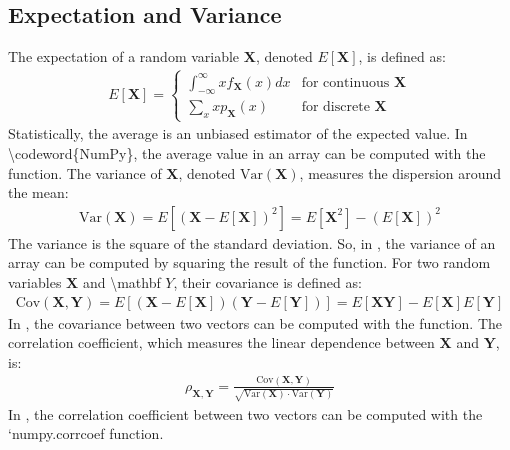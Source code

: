 \documentclass[letterpaper,10pt,english]{jupyterBook}
\begin{document}
\subsection{Expectation and Variance}
\label{\detokenize{01:expectation-and-variance}}
\sphinxAtStartPar
The expectation of a random variable \(\mathbf X\), denoted \(E[\mathbf X]\), is defined as:
\begin{equation*}
\begin{split}
E[\mathbf X] = \begin{cases}
    \int_{-\infty}^{\infty} x f_{\mathbf X}(x) dx & \text{for continuous $\mathbf X$} \\
    \sum_{x} x p_{\mathbf X}(x) & \text{for discrete $\mathbf X$}
\end{cases}
\end{split}
\end{equation*}
\sphinxAtStartPar
Statistically, the average is an unbiased estimator of the expected value. In \textbackslash{}codeword\{NumPy\}, the average value in an array can be computed with the  function.
The variance of \(\mathbf X\), denoted \(\text{Var}(\mathbf X)\), measures the dispersion around the mean:
\begin{equation*}
\begin{split}
\text{Var}(\mathbf X) = E[(\mathbf X - E[\mathbf X])^2] = E[\mathbf X^2] - (E[\mathbf X])^2
\end{split}
\end{equation*}
\sphinxAtStartPar
The variance is the square of the standard deviation.
So, in , the variance of an array can be computed by squaring the result of the  function.
For two random variables \(\mathbf X\) and \textbackslash{}mathbf \(Y\), their covariance is defined as:
\begin{equation*}
\begin{split}
\text{Cov}(\mathbf X, \mathbf Y) = E[(\mathbf X - E[\mathbf X])(\mathbf Y - E[\mathbf Y])] = E[\mathbf X\mathbf Y] - E[\mathbf X]E[\mathbf Y]
\end{split}
\end{equation*}
\sphinxAtStartPar
In , the covariance between two vectors can be computed with the  function.
The correlation coefficient, which measures the linear dependence between \(\mathbf X\) and \(\mathbf Y\), is:
\begin{equation*}
\begin{split}
\rho_{\mathbf X,\mathbf Y} = \frac{\text{Cov}(\mathbf X, \mathbf Y)}{\sqrt{\text{Var}(\mathbf X) \cdot \text{Var}(\mathbf Y)}}
\end{split}
\end{equation*}
\sphinxAtStartPar
In , the correlation coefficient between two vectors can be computed with the `numpy.corrcoef function.
\end{document}
